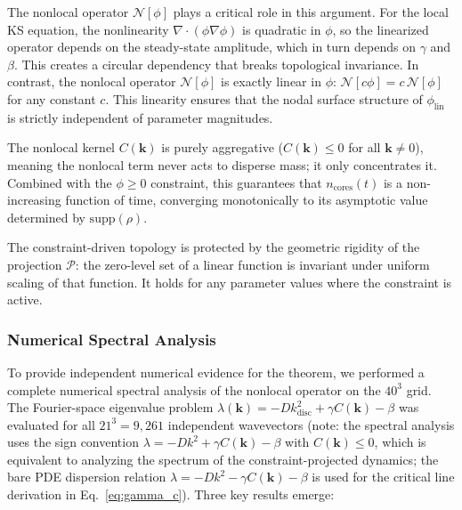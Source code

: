 \documentclass[sn-nature,pdflatex]{sn-jnl}
\begin{document}
The nonlocal operator $\mathcal{N}[\phi]$ plays a critical role in this argument. For the local KS equation, the nonlinearity $\nabla\cdot(\phi\nabla\phi)$ is quadratic in $\phi$, so the linearized operator depends on the steady-state amplitude, which in turn depends on $\gamma$ and $\beta$. This creates a circular dependency that breaks topological invariance. In contrast, the nonlocal operator $\mathcal{N}[\phi]$ is exactly linear in $\phi$: $\mathcal{N}[c\phi] = c\,\mathcal{N}[\phi]$ for any constant $c$. This linearity ensures that the nodal surface structure of $\phi_{\text{lin}}$ is strictly independent of parameter magnitudes.

The nonlocal kernel $C(\mathbf{k})$ is purely aggregative ($C(\mathbf{k}) \le 0$ for all $\mathbf{k} \neq 0$), meaning the nonlocal term never acts to disperse mass; it only concentrates it. Combined with the $\phi \ge 0$ constraint, this guarantees that $n_{\text{cores}}(t)$ is a non-increasing function of time, converging monotonically to its asymptotic value determined by $\text{supp}(\rho)$.

The constraint-driven topology is protected by the geometric rigidity of the projection $\mathcal{P}$: the zero-level set of a linear function is invariant under uniform scaling of that function. It holds for any parameter values where the constraint is active.

\subsubsection{Numerical Spectral Analysis}
\label{sec:spectral_analysis}

To provide independent numerical evidence for the theorem, we performed a complete numerical spectral analysis of the nonlocal operator on the $40^3$ grid.
The Fourier-space eigenvalue problem $\lambda(\mathbf{k}) = -D k^2_{\text{disc}} + \gamma C(\mathbf{k}) - \beta$ was evaluated for all $21^3 = 9,261$ independent wavevectors (note: the spectral analysis uses the sign convention $\lambda = -D k^2 + \gamma C(\mathbf{k}) - \beta$ with $C(\mathbf{k}) \le 0$, which is equivalent to analyzing the spectrum of the constraint-projected dynamics; the bare PDE dispersion relation $\lambda = -D k^2 - \gamma C(\mathbf{k}) - \beta$ is used for the critical line derivation in Eq.~\ref{eq:gamma_c}).
Three key results emerge:
\end{document}
